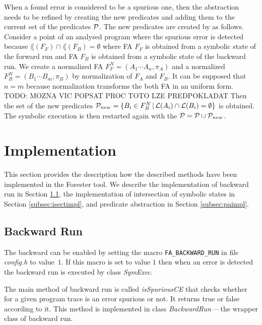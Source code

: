 When a found error is considered to be a spurious one, then the abstraction needs to be refined
by creating the new predicates and adding them to the current set of the predicates $\mathcal{P}$.
The new predicates are created by as follows.
Consider a point of an analysed program where the spurious error is detected
because $\lang(F_F) \cap \lang(F_B) = \emptyset$ where FA $F_F$ is obtained
from a symbolic state of the forward run and FA $F_B$ is obtained from a symbolic state of
the backward run.
We create a normalized FA $F_F^N = (A_1 \cdots A_n, \pi_A)$ and a normalized $F_B^N = (B_1 \cdots B_m, \pi_B)$
by normalization of $F_A$ and $F_B$.
It can be supposed that $n = m$ because normalization transforms
the both FA in an uniform form.
TODO: MOZNA VIC POPSAT PROC TOTO LZE PREDPOKLADAT
Then the set of the new predicates $\mathcal{P}_{new} = \{B_i \in F^N_B \,|\, \mathcal{L}(A_i) \cap \mathcal{L}(B_i) =
\emptyset\}$ is obtained.
The symbolic execution is then restarted again with the $\mathcal{P} = \mathcal{P} \cup \mathcal{P}_{new}$.

\section{Implementation}
\label{sec:impl}

This section provides the description how the described methods have been implemented
in the Forester tool.
We describe the implementation of backward run in Section \ref{subsec:bwimpl},
the implementation of intersection of symbolic states in Section \ref{subsec:isectimpl}, and
predicate abstraction in Section \ref{subsec:paimpl}.

\subsection{Backward Run}
\label{subsec:bwimpl}

The backward can be enabled by setting the macro {\tt FA\_BACKWARD\_RUN}
in file \emph{config.h} to value~$1$.
If this macro is set to value $1$ then when an error is detected 
the backward run is executed by class \emph{SymExec}.

The main method of backward run is called \emph{isSpuriousCE} that
checks whether for a given program trace is an error
spurious or not.
It returns true or false according to it.
This method is implemented in class \emph{BackwardRun}\,---\,the wrapper
class of backward run.


